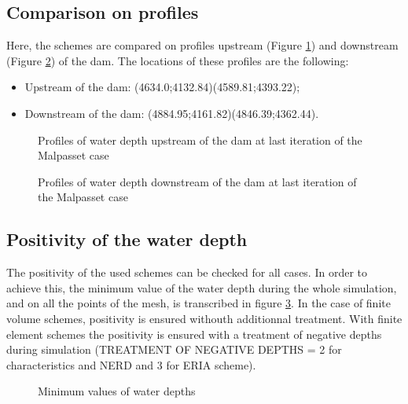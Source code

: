 \subsection{Comparison on profiles}
Here, the schemes are compared on profiles upstream (Figure \ref{fig:malpasset:upstreamProfile}) and downstream (Figure \ref{fig:malpasset:downstreamProfile}) of the dam. The locations of these profiles are the following:
\begin{itemize}
\itemsep0em
\item Upstream of the dam: (4634.0;4132.84)(4589.81;4393.22);
\item Downstream of the dam: (4884.95;4161.82)(4846.39;4362.44).
\end{itemize}

\begin{figure}[H]
  \centering
  \caption{Profiles of water depth upstream of the dam at last iteration of the Malpasset case}\label{fig:malpasset:upstreamProfile}
\end{figure}

\begin{figure}[H]
  \centering
  \caption{Profiles of water depth downstream of the dam at last iteration of the Malpasset case}\label{fig:malpasset:downstreamProfile}
\end{figure}


\subsection{Positivity of the water depth}

The positivity of the used schemes can be checked for all cases. In order to achieve this, the minimum value of the water depth during the whole simulation, and on all the points of the mesh, is transcribed in figure \ref{fig:malpasset:minmax}.
In the case of finite volume schemes, positivity is ensured withouth additionnal treatment.
With finite element schemes the positivity is ensured with a treatment of negative depths
during simulation (TREATMENT OF NEGATIVE DEPTHS = 2 for characteristics and NERD and 3 for ERIA scheme).

\begin{figure}[H]
\centering
{}
\caption{Minimum values of water depths}
\label{fig:malpasset:minmax}
\end{figure}

